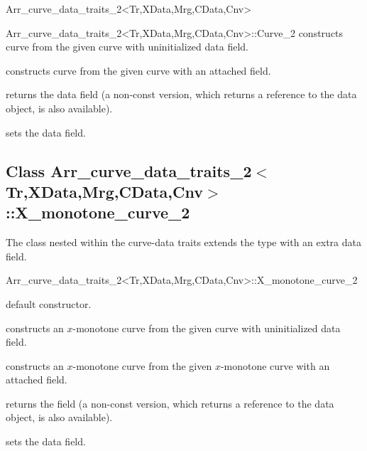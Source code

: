 \begin{ccRefClass}{Arr_curve_data_traits_2<Tr,XData,Mrg,CData,Cnv>}
\begin{ccClass}{Arr_curve_data_traits_2<Tr,XData,Mrg,CData,Cnv>::Curve_2}
    {constructs curve from the given  curve with uninitialized
     data field.}

    {constructs curve from the given  curve with an attached
      field.}

\ccAccessFunctions

  {returns the data field (a non-const version, which returns a reference
   to the data object, is also available).}

  {sets the data field.}

\end{ccClass}

\subsection*{Class Arr\_curve\_data\_traits\_2$<$Tr,XData,Mrg,CData,Cnv$>$::X\_monotone\_curve\_2}

The  class nested within the
curve-data traits extends the  type
with an extra data field.

\begin{ccClass}{Arr_curve_data_traits_2<Tr,XData,Mrg,CData,Cnv>::X_monotone_curve_2}

\ccInheritsFrom

\ccCreation
{}

    {default constructor.}

    {constructs an $x$-monotone curve from the given  curve with
     uninitialized data field.}

    {constructs an $x$-monotone curve from the given  $x$-monotone
     curve with an attached  field.}

\ccAccessFunctions

  {returns the field (a non-const version, which returns a reference
   to the data object, is also available).}

  {sets the data field.}

\end{ccClass}

\end{ccRefClass}

\ccRefPageEnd
